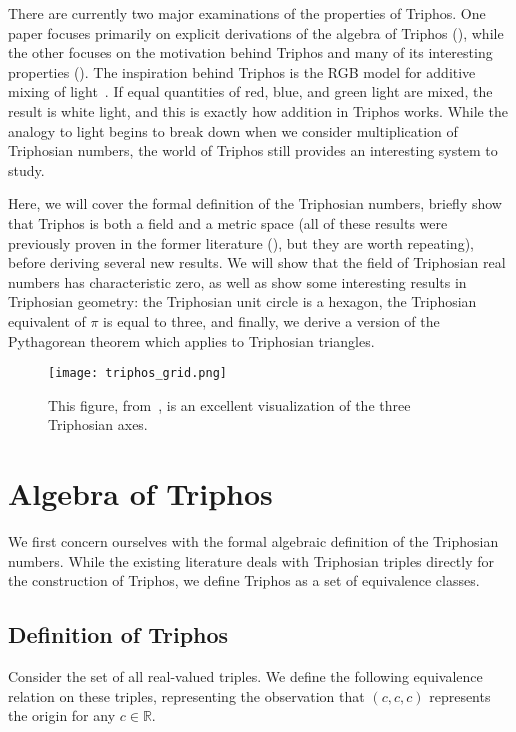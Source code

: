 \documentclass[11pt]{article}
\theoremstyle{definition}
\theoremstyle{plain}
\theoremstyle{remark}
\begin{document}
	There are currently two major examinations of the properties of Triphos.
	One paper focuses primarily on explicit derivations of the algebra of
	Triphos (\cite{egging}), while the other focuses on the motivation behind
	Triphos and many of its interesting properties (\cite{grossnickle}). The
	inspiration behind Triphos is the RGB model for additive mixing of
	light~\cite{grossnickle}. If equal quantities of red, blue, and green light
	are mixed, the result is white light, and this is exactly how addition in
	Triphos works. While the analogy to light begins to break down when we
	consider multiplication of Triphosian numbers, the world of Triphos still
	provides an interesting system to study.

	Here, we will cover the formal definition of the Triphosian numbers,
	briefly show that Triphos is both a field and a metric space (all of these
	results were previously proven in the former literature
	(\cite{egging,grossnickle}), but they are worth repeating), before deriving
	several new results. We will show that the field of Triphosian real numbers
	has characteristic zero, as well as show some interesting results in
	Triphosian geometry: the Triphosian unit circle is a hexagon, the
	Triphosian equivalent of \(\pi\) is equal to three, and finally, we derive
	a version of the Pythagorean theorem which applies to Triphosian triangles.

	\begin{figure}[tbp]
		\centering
		\texttt{[image: triphos\_grid.png]}
		\caption{This figure, from~\cite{egging}, is an excellent visualization
		of the three Triphosian axes.}
		\label{fig:grid}
	\end{figure}

	\section{Algebra of Triphos}

	We first concern ourselves with the formal algebraic definition of the
	Triphosian numbers. While the existing literature deals with Triphosian
	triples directly for the construction of Triphos, we define Triphos as a
	set of equivalence classes.

	\subsection{Definition of Triphos}

	Consider the set of all real-valued triples. We define the following
	equivalence relation on these triples, representing the observation that
	\((c,c,c)\) represents the origin for any \(c \in \mathbb{R}\).
\end{document}
